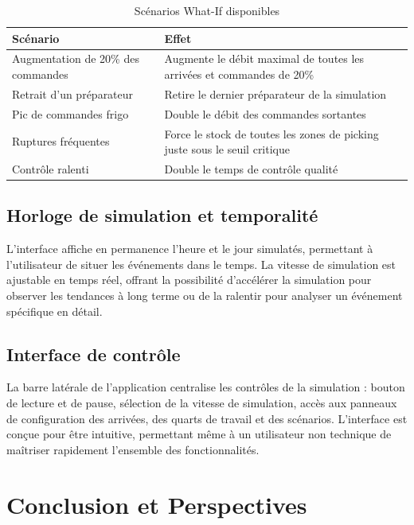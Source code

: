 \documentclass[12pt,a4paper]{report}
\begin{document}
\begin{table}[H]
\centering
\caption{Sc\'enarios What-If disponibles}
\label{tab:scenarios}
\begin{tabularx}{\textwidth}{|l|X|}
\hline
\textbf{Sc\'enario} & \textbf{Effet} \\
\hline
Augmentation de 20\% des commandes & Augmente le d\'ebit maximal de toutes les arriv\'ees et commandes de 20\% \\
\hline
Retrait d'un pr\'eparateur & Retire le dernier pr\'eparateur de la simulation \\
\hline
Pic de commandes frigo & Double le d\'ebit des commandes sortantes \\
\hline
Ruptures fr\'equentes & Force le stock de toutes les zones de picking juste sous le seuil critique \\
\hline
Contr\^ole ralenti & Double le temps de contr\^ole qualit\'e \\
\hline
\end{tabularx}
\end{table}

\section{Horloge de simulation et temporalit\'e}

L'interface affiche en permanence l'heure et le jour simulat\'es, permettant \`a l'utilisateur de situer les \'ev\'enements dans le temps. La vitesse de simulation est ajustable en temps r\'eel, offrant la possibilit\'e d'acc\'el\'erer la simulation pour observer les tendances \`a long terme ou de la ralentir pour analyser un \'ev\'enement sp\'ecifique en d\'etail.

\section{Interface de contr\^ole}

La barre lat\'erale de l'application centralise les contr\^oles de la simulation : bouton de lecture et de pause, s\'election de la vitesse de simulation, acc\`es aux panneaux de configuration des arriv\'ees, des quarts de travail et des sc\'enarios. L'interface est con\c{c}ue pour \^etre intuitive, permettant m\^eme \`a un utilisateur non technique de ma\^itriser rapidement l'ensemble des fonctionnalit\'es.


\chapter{Conclusion et Perspectives}
\end{document}
